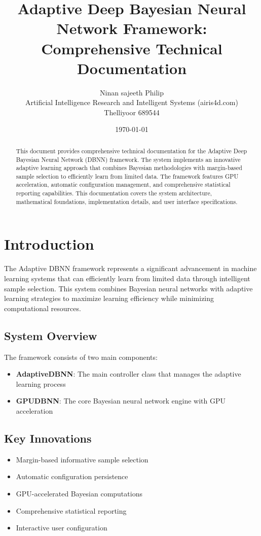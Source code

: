 \documentclass[11pt]{article}
\title{Adaptive Deep Bayesian Neural Network Framework: \\ Comprehensive Technical Documentation}
\author{Ninan sajeeth Philip\\ Artificial Intelligence Research and Intelligent Systems (airis4d.com)\\Thelliyoor 689544}
\date{\today}
\begin{document}
\maketitle

\begin{abstract}
This document provides comprehensive technical documentation for the Adaptive Deep Bayesian Neural Network (DBNN) framework. The system implements an innovative adaptive learning approach that combines Bayesian methodologies with margin-based sample selection to efficiently learn from limited data. The framework features GPU acceleration, automatic configuration management, and comprehensive statistical reporting capabilities. This documentation covers the system architecture, mathematical foundations, implementation details, and user interface specifications.
\end{abstract}

\tableofcontents

\section{Introduction}

The Adaptive DBNN framework represents a significant advancement in machine learning systems that can efficiently learn from limited data through intelligent sample selection. This system combines Bayesian neural networks with adaptive learning strategies to maximize learning efficiency while minimizing computational resources.

\subsection{System Overview}

The framework consists of two main components:
\begin{itemize}
\item \textbf{AdaptiveDBNN}: The main controller class that manages the adaptive learning process
\item \textbf{GPUDBNN}: The core Bayesian neural network engine with GPU acceleration
\end{itemize}

\subsection{Key Innovations}

\begin{itemize}
\item Margin-based informative sample selection
\item Automatic configuration persistence
\item GPU-accelerated Bayesian computations
\item Comprehensive statistical reporting
\item Interactive user configuration
\end{itemize}
\end{document}
